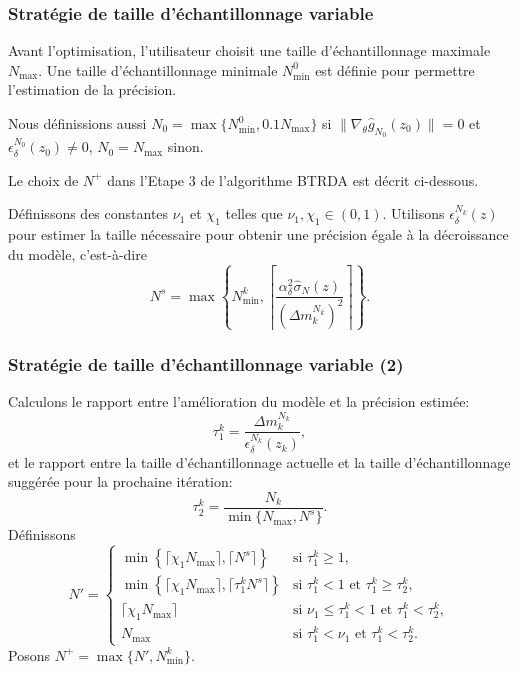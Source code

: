 \documentclass[french]{beamer}
\begin{document}
\begin{frame}
\frametitle{Stratégie de taille d'échantillonnage variable}

Avant l'optimisation, l'utilisateur choisit une taille
d'échantillonnage maximale $N_{\max}$.
Une taille d'échantillonnage minimale $N^0_{\min}$ est définie pour
permettre l'estimation de la précision.

\mbox{}

Nous définissions aussi $N_0 = \max\lbrace N^0_{\min},
0.1N_{\max}\rbrace$ si $\| \nabla_{\theta} \hat{g}_{N_0}(z_0) \| = 0$
et $\epsilon_{\delta}^{N_0}(z_0) \ne 0$, $N_0 = N_{\max}$ sinon.

\mbox{}

Le choix de $N^+$ dans l'Etape 3 de l'algorithme BTRDA est décrit
ci-dessous.

\mbox{}

Définissons des constantes $\nu_1$ et $\chi_1$ telles que $\nu_1,
\chi_1 \in (0,1)$.
Utilisons $\epsilon_{\delta}^{N_k}(z)$ pour estimer la taille
nécessaire pour obtenir une précision égale à la décroissance du
modèle, c'est-à-dire
\[
N^s = \max \left\lbrace N^k_{\min},
\left\lceil
\frac{\alpha^2_{\delta}  \hat{\sigma}_N(z)}{(\Delta m_k^{N_k})^2}
\right\rceil \right\rbrace.
\]

\end{frame}

\begin{frame}
\frametitle{Stratégie de taille d'échantillonnage variable (2)}

Calculons le rapport entre l'amélioration du modèle et la précision estimée:
\[
\tau_1^k = \frac{\Delta m_k^{N_k}}{\epsilon_\delta^{N_k} (z_k)},
\]
et le rapport entre la taille d'échantillonnage actuelle et la taille
d'échantillonnage suggérée pour la prochaine itération:
\[
\tau_2^k = \frac{N_k}{\min \lbrace N_{\max}, N^s \rbrace}.
\]
Définissons
\[
N' =
\begin{cases}
 \min \left\lbrace \lceil \chi_1 N_{\max} \rceil, \lceil N^s
 \rceil \right\rbrace & \text{si } \tau_1^k \geq 1, \\
 \min \left\lbrace \lceil \chi_1 N_{\max} \rceil, \lceil \tau_1^kN^s
 \rceil  \right\rbrace &  \text{si } \tau_1^k < 1 \text{ et }
 \tau_1^k \geq  \tau_2^k,\\
 \lceil \chi_1 N_{\max} \rceil & \text{si }  \nu_1 \leq \tau_1^k <
 1\text{ et }\tau_1^k < \tau_2^k,\\
 N_{\max} & \text{si } \tau_1^k < \nu_1\text{ et }\tau_1^k < \tau_2^k.
\end{cases}
\]
Posons $N^+ = \max\lbrace N', N^k_{\min}\rbrace$.

\end{frame}
\end{document}
